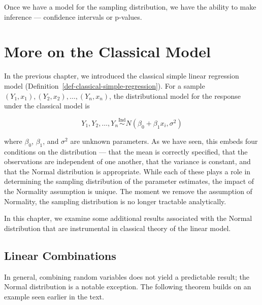 \documentclass[
  letterpaper,
  DIV=11,
  numbers=noendperiod]{scrreprt}
\theoremstyle{definition}
\theoremstyle{plain}
\theoremstyle{definition}
\theoremstyle{remark}
\begin{document}
Once we have a model for the sampling distribution, we have the ability
to make inference --- confidence intervals or p-values.


\chapter{More on the Classical Model}\label{sec-normality}

\providecommand{\norm}[1]{\left\lVert#1\right\rVert}
\providecommand{\abs}[1]{\left\lvert#1\right\rvert}
\providecommand{\dist}[1]{\stackrel{\text{#1}}{\sim}}
\providecommand{\ind}[1]{\mathbb{I}\left(#1\right)}
\providecommand{\bm}[1]{\mathbf{#1}}
\providecommand{\bs}[1]{\boldsymbol{#1}}
\providecommand{\Ell}{\mathcal{L}}
\providecommand{\indep}{\perp\negthickspace\negmedspace\perp}

In the previous chapter, we introduced the classical simple linear
regression model (Definition~\ref{def-classical-simple-regression}). For
a sample
\(\left(Y_1, x_1\right), \left(Y_2, x_2\right), \dotsc, \left(Y_n, x_n\right)\),
the distributional model for the response under the classical model is

\[Y_1, Y_2, \dotsc, Y_n \stackrel{\text{Ind}}{\sim} N\left(\beta_0 + \beta_1 x_i, \sigma^2\right)\]

where \(\beta_0\), \(\beta_1\), and \(\sigma^2\) are unknown parameters.
As we have seen, this embeds four conditions on the distribution ---
that the mean is correctly specified, that the observations are
independent of one another, that the variance is constant, and that the
Normal distribution is appropriate. While each of these plays a role in
determining the sampling distribution of the parameter estimates, the
impact of the Normality assumption is unique. The moment we remove the
assumption of Normality, the sampling distribution is no longer
tractable analytically.

In this chapter, we examine some additional results associated with the
Normal distribution that are instrumental in classical theory of the
linear model.

\section{Linear Combinations}\label{linear-combinations}

In general, combining random variables does not yield a predictable
result; the Normal distribution is a notable exception. The following
theorem builds on an example seen earlier in the text.
\end{document}
